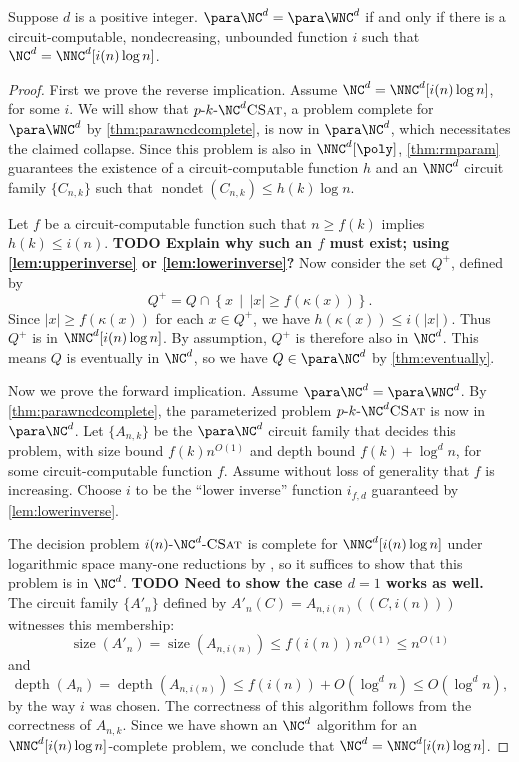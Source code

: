 \documentclass{article}
\newcommand{\todo}[1]{\textbf{TODO #1}}
\newcommand{\dash}{\textnormal{-}}
\newcommand{\pNCSAT}{p \dash k \dash \NC^d \textsc{CSat}}
\DeclareMathOperator{\depth}{depth}
\DeclareMathOperator{\nondet}{nondet}
\DeclareMathOperator{\size}{size}
\begin{document}
\begin{theorem}\label{thm:ncwnc}
  Suppose $d$ is a positive integer.
  $\para \NC^d = \para \WNC^d$ if and only if there is a circuit-computable, nondecreasing, unbounded function $i$ such that $\NC^d = \NNC^d[i(n) \log n]$.
\end{theorem}
\begin{proof}
  First we prove the reverse implication.
  Assume $\NC^d = \NNC^d[i(n) \log n]$, for some $i$.
  We will show that $\pNCSAT$, a problem complete for $\para \WNC^d$ by \autoref{thm:parawncdcomplete}, is now in $\para \NC^d$, which necessitates the claimed collapse.
  Since this problem is also in $\NNC^d[\poly]$, \autoref{thm:rmparam} guarantees the existence of a circuit-computable function $h$ and an $\NNC^d$ circuit family $\{C_{n, k}\}$ such that $\nondet(C_{n, k}) \leq h(k) \log n$.

  Let $f$ be a circuit-computable function such that $n \geq f(k)$ implies $h(k) \leq i(n)$.
  \todo{Explain why such an $f$ must exist; using \autoref{lem:upperinverse} or \autoref{lem:lowerinverse}?}
  Now consider the set $Q^+$, defined by
  \[
  Q^+ = Q \cap \left\{ x \, \middle| \, |x| \geq f(\kappa(x)) \right\}.
  \]
  Since $|x| \geq f(\kappa(x))$ for each $x \in Q^+$, we have $h(\kappa(x)) \leq i(|x|)$.
  Thus $Q^+$ is in $\NNC^d[i(n) \log n]$.
  By assumption, $Q^+$ is therefore also in $\NC^d$.
  This means $Q$ is eventually in $\NC^d$, so we have $Q \in \para \NC^d$ by \autoref{thm:eventually}.

  Now we prove the forward implication.
  Assume $\para \NC^d = \para \WNC^d$.
  By \autoref{thm:parawncdcomplete}, the parameterized problem $\pNCSAT$ is now in $\para \NC^d$.
  Let $\{A_{n, k}\}$ be the $\para \NC^d$ circuit family that decides this problem, with size bound $f(k) n^{O(1)}$ and depth bound $f(k) + \log^d n$, for some circuit-computable function $f$.
  Assume without loss of generality that $f$ is increasing.
  Choose $i$ to be the ``lower inverse'' function $i_{f, d}$ guaranteed by \autoref{lem:lowerinverse}.

  The decision problem $i(n) \dash \NC^d \dash \textsc{CSat}$ is complete for $\NNC^d[i(n) \log n]$ under logarithmic space many-one reductions by \autocite[Theorem~3.6]{cc97lim}, so it suffices to show that this problem is in $\NC^d$.
  \todo{Need to show the case $d = 1$ works as well.}
  The circuit family $\{A'_n\}$ defined by $A'_n(C) = A_{n, i(n)}((C, i(n)))$ witnesses this membership:
  \[
  \size(A'_n) = \size(A_{n, i(n)}) \leq f(i(n)) n^{O(1)} \leq n^{O(1)}
  \]
  and
  \[
  \depth(A_n) = \depth(A_{n, i(n)}) \leq f(i(n)) + O(\log^d n) \leq O(\log^d n),
  \]
  by the way $i$ was chosen.
  The correctness of this algorithm follows from the correctness of $A_{n, k}$.
  Since we have shown an $\NC^d$ algorithm for an $\NNC^d[i(n) \log n]$-complete problem, we conclude that $\NC^d = \NNC^d[i(n) \log n]$.
\end{proof}
\end{document}
